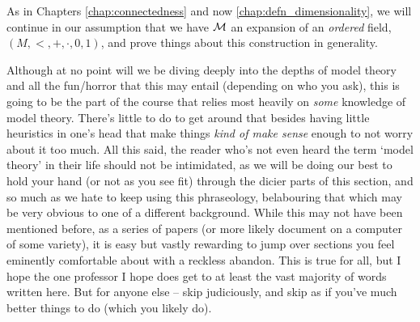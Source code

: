 

\begin{svgraybox}
  As in Chapters \ref{chap:connectedness} and now \ref{chap:defn_dimensionality}, we will continue in our assumption that we have $\mathcal{M}$ an \om expansion of an \emph{ordered} field, $(M, <, +, \cdot, 0, 1)$, and prove things about this construction in generality.
\end{svgraybox}

Although at no point will we be diving deeply into the depths of model theory and all the fun/horror that this may entail (depending on who you ask), this is going to be the part of the course that relies most heavily on \emph{some} knowledge of model theory. There's little to do to get around that besides having little heuristics in one's head that make things \emph{kind of make sense} enough to not worry about it too much. All this said, the reader who's not even heard the term `model theory' in their life should not be intimidated, as we will be doing our best to hold your hand (or not as you see fit) through the dicier parts of this section, and so much as we hate to keep using this phraseology, belabouring that which may be very obvious to one of a different background. While this may not have been mentioned before, as a series of papers (or more likely document on a computer of some variety), it is easy but vastly rewarding to jump over sections you feel eminently comfortable about with a reckless abandon. This is true for all, but I hope the one professor I hope does get to at least the vast majority of words written here. But for anyone else -- skip judiciously, and skip as if you've much better things to do (which you likely do).

